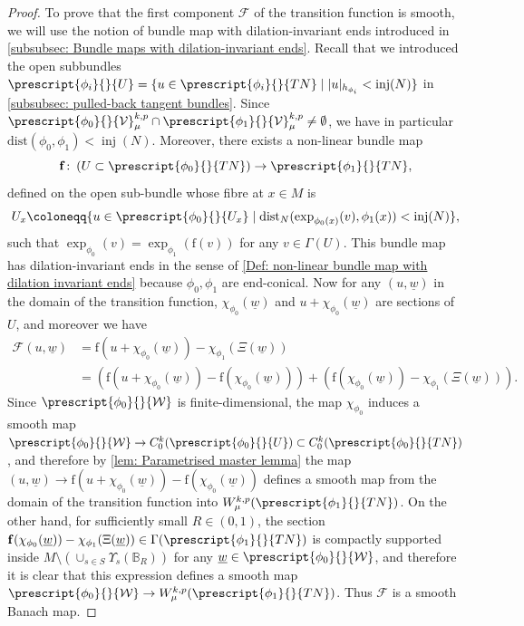 \documentclass{article}
\numberwithin{equation}{section}        %
\theoremstyle{bfnote}
\theoremstyle{definition}
\theoremstyle{bfremark}
\newcommand{\col}{\colon \thinspace}        %
\newcommand{\Ball}{\mathbb{B}}              %
\newcommand{\bmap}[1]{\boldsymbol{\mathrm{#1}}}     %
\DeclareMathOperator{\inj}{inj}                 %
\begin{document}
\begin{proof}
    To prove that the first component $\mathcal{F}$ of the transition function is smooth, we will use the notion of bundle map with dilation-invariant ends introduced in \cref{subsubsec: Bundle maps with dilation-invariant ends}. Recall that we introduced the open subbundles $\prescript{\phi_i}{}{U} = \{ u \in \prescript{\phi_i}{}{TN} \mid |u|_{h_{\phi_i}} < \inj(N) \}$ in \cref{subsubsec: pulled-back tangent bundles}. Since $\prescript{\phi_0}{}{\mathcal{V}}^{k,p}_\mu \cap \prescript{\phi_1}{}{\mathcal{V}}^{k,p}_\mu \neq \emptyset$, we have in particular $\mathrm{dist}(\phi_0,\phi_1) < \inj(N)$. Moreover, there exists a non-linear bundle map 
    \begin{equation*}
        \bmap{f} \col (U \subset \prescript{\phi_0}{}{TN}) \to \prescript{\phi_1}{}{TN} ,
    \end{equation*} 
    defined on the open sub-bundle whose fibre at $x \in M$ is 
    \begin{equation*}
        U_x \coloneqq \{ u \in \prescript{\phi_0}{}{U_x} \mid \mathrm{dist}_N(\exp_{\phi_0(x)}(v),\phi_1(x)) < \inj(N) \},
    \end{equation*} 
    such that $\exp_{\phi_0}(v) = \exp_{\phi_1}(\bmap{f}(v))$ for any $v \in \Gamma(U)$.
    This bundle map has dilation-invariant ends in the sense of \cref{Def: non-linear bundle map with dilation invariant ends} because $\phi_0,\phi_1$ are end-conical. Now for any $(u,\underline{w})$ in the domain of the transition function, $\chi_{\phi_0}(\underline{w})$ and $u + \chi_{\phi_0}(\underline{w})$ are sections of $U$, and moreover we have
    \begin{align*}
        \mathcal{F}(u,\underline{w}) & = \bmap{f}(u+\chi_{\phi_0}(\underline{w})) - \chi_{\phi_1}(\Xi(\underline{w})) \\ 
            & = (\bmap{f}(u+\chi_{\phi_0}(\underline{w})) - \bmap{f}(\chi_{\phi_0}(\underline{w}))) + (\bmap{f}(\chi_{\phi_0}(\underline{w})) - \chi_{\phi_1}(\Xi(\underline{w}))) .
    \end{align*}
    Since $\prescript{\phi_0}{}{\mathcal{W}}$ is finite-dimensional, the map $\chi_{\phi_0}$ induces a smooth map $\prescript{\phi_0}{}{\mathcal{W}} \to C^{k}_0(\prescript{\phi_0}{}{U}) \subset C^k_0(\prescript{\phi_0}{}{TN})$, and therefore by \cref{lem: Parametrised master lemma} the map $(u,\underline{w}) \to \bmap{f}(u+\chi_{\phi_0}(\underline{w}))-\bmap{f}(\chi_{\phi_0}(\underline{w}))$ defines a smooth map from the domain of the transition function into $W^{k,p}_\mu(\prescript{\phi_1}{}{TN})$. On the other hand, for sufficiently small $R \in (0,1)$, the section $\bmap{f}(\chi_{\phi_0}(\underline{w})) - \chi_{\phi_1}(\Xi(\underline{w})) \in \Gamma(\prescript{\phi_1}{}{TN})$ is compactly supported inside $M \setminus (\cup_{s \in S} \Upsilon_s(\Ball_R))$ for any $\underline{w} \in \prescript{\phi_0}{}{\mathcal{W}}$, and therefore it is clear that this expression defines a smooth map $\prescript{\phi_0}{}{\mathcal{W}} \to W^{k,p}_\mu(\prescript{\phi_1}{}{TN})$. Thus  $\mathcal{F}$ is a smooth Banach map.
\end{proof}
\end{document}
